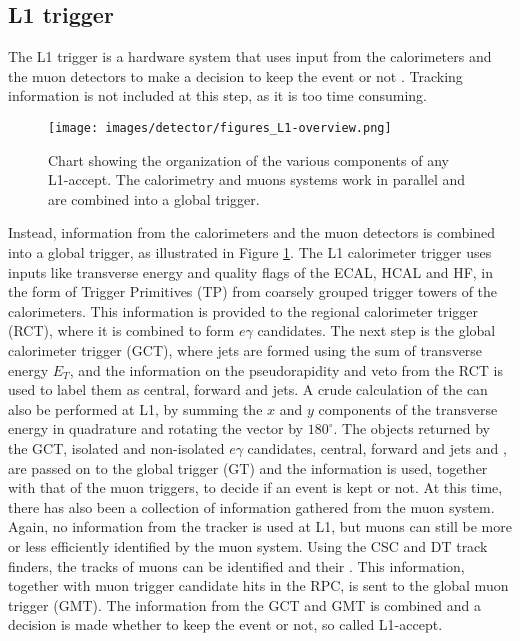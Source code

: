 \subsection{L1 trigger}
The L1 trigger is a hardware system that uses input from the calorimeters and the muon detectors to make a decision to keep the event or not \cite{Khachatryan:2016bia}. 
Tracking information is not included at this step, as it is too time consuming. 
\begin{figure}[!htp]
  \centering
   \texttt{[image: images/detector/figures\_L1-overview.png]}
   \caption{Chart showing the organization of the various components of any L1-accept. The calorimetry and muons systems work in parallel and are combined into a global trigger.}
   \label{fig:L1}
\end{figure}                                                                           
Instead, information from the calorimeters and the muon detectors is combined into a global trigger, as illustrated in Figure \ref{fig:L1}. 
The L1 calorimeter trigger uses inputs like transverse energy and quality flags of the ECAL, HCAL and HF, in the form of Trigger Primitives (TP) from coarsely grouped trigger towers of the calorimeters.
This information is provided to the regional calorimeter trigger (RCT), where it is combined to form $e\gamma$ candidates. 
The next step is the global calorimeter trigger (GCT), where jets are formed using the sum of transverse energy $E_{T}$, and the information on the pseudorapidity and \Tau veto from the RCT is used to label them as central, forward and \Tau jets. 
A crude calculation of the \ptmiss can also be performed at L1, by summing the $x$ and $y$ components of the transverse energy in quadrature and rotating the vector by $180^{\circ}$. 
The objects returned by the GCT, isolated and non-isolated $e\gamma$ candidates, central, forward and \Tau jets and \ptmiss, are passed on to the global trigger (GT) and the information is used, together with that of the muon triggers, to decide if an event is kept or not.   
At this time, there has also been a collection of information gathered from the muon system. 
Again, no information from the tracker is used at L1, but muons can still be more or less efficiently identified by the muon system. 
Using the CSC and DT track finders, the tracks of muons can be identified and their \pt. 
This information, together with muon trigger candidate hits in the RPC, is sent to the global muon trigger (GMT). 
The information from the GCT and GMT is combined and a decision is made whether to keep the event or not, so called L1-accept. 
